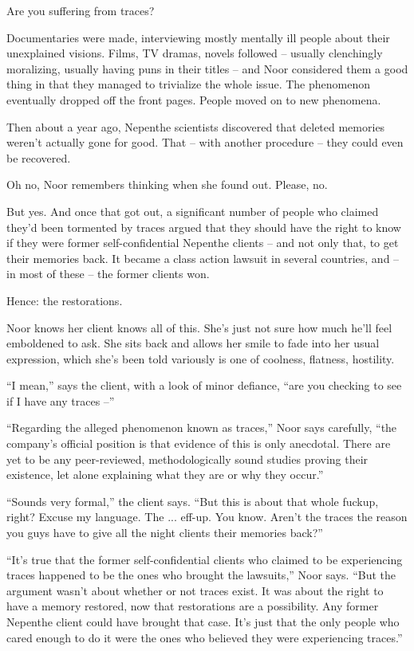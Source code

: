 \documentclass[12pt,a5paper]{book}
\newcommand{\qm}[1]{“#1”}
\begin{document}
Are you suffering from traces?

Documentaries were made, interviewing mostly mentally ill people about their unexplained visions. Films, TV dramas, novels followed – usually clenchingly moralizing, usually having puns in their titles – and Noor considered them a good thing in that they managed to trivialize the whole issue. The phenomenon eventually dropped off the front pages. People moved on to new phenomena.

Then about a year ago, Nepenthe scientists discovered that deleted memories weren't actually gone for good. That – with another procedure – they could even be recovered.

Oh no, Noor remembers thinking when she found out. Please, no.

But yes. And once that got out, a significant number of people who claimed they'd been tormented by traces argued that they should have the right to know if they were former self-confidential Nepenthe clients – and not only that, to get their memories back. It became a class action lawsuit in several countries, and – in most of these – the former clients won.

Hence: the restorations.

Noor knows her client knows all of this. She's just not sure how much he'll feel emboldened to ask. She sits back and allows her smile to fade into her usual expression, which she's been told variously is one of coolness, flatness, hostility.

\qm{I mean,} says the client, with a look of minor defiance, \qm{are you checking to see if I have any traces –}

\qm{Regarding the alleged phenomenon known as traces,} Noor says carefully, \qm{the company's official position is that evidence of this is only anecdotal. There are yet to be any peer-reviewed, methodologically sound studies proving their existence, let alone explaining what they are or why they occur.}

\qm{Sounds very formal,} the client says. \qm{But this is about that whole fuckup, right? Excuse my language. The ... eff-up. You know. Aren't the traces the reason you guys have to give all the night clients their memories back?}

\qm{It's true that the former self-confidential clients who claimed to be experiencing traces happened to be the ones who brought the lawsuits,} Noor says. \qm{But the argument wasn't about whether or not traces exist. It was about the right to have a memory restored, now that restorations are a possibility. Any former Nepenthe client could have brought that case. It's just that the only people who cared enough to do it were the ones who believed they were experiencing traces.}
\end{document}
